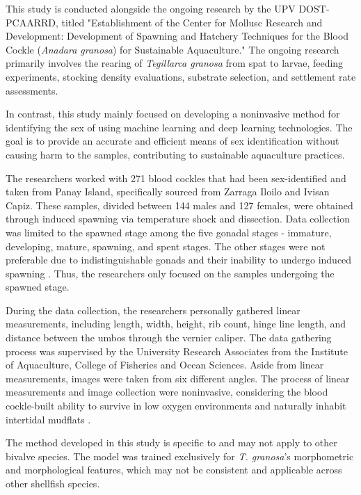 This study is conducted alongside the ongoing research by the UPV DOST-PCAARRD, titled "Establishment of the Center for Mollusc Research and Development: Development of Spawning and Hatchery Techniques for the Blood Cockle (\textit{Anadara granosa}) for Sustainable Aquaculture." The ongoing research primarily involves the rearing of \textit{Tegillarca granosa} from spat to larvae, feeding experiments, stocking density evaluations, substrate selection, and settlement rate assessments.

In contrast, this study mainly focused on developing a noninvasive method for identifying the sex of \Tgranosa using machine learning and deep learning technologies. The goal is to provide an accurate and efficient means of sex identification without causing harm to the samples, contributing to sustainable aquaculture practices.

The researchers worked with 271  blood cockles that had been sex-identified and taken from Panay Island, specifically sourced from Zarraga Iloilo and Ivisan Capiz. These samples, divided between 144 males and 127 females, were obtained through induced spawning via temperature shock and dissection. Data collection was limited to the spawned stage among the five gonadal stages  - immature, developing, mature, spawning, and spent stages. The other stages were not preferable due to indistinguishable gonads and their inability to undergo induced spawning \cite{may2021}.  Thus, the researchers only focused on the samples undergoing the spawned stage. 

During the data collection,  the researchers personally gathered linear measurements, including length, width, height, rib count, hinge line length, and distance between the umbos through the vernier caliper. The data gathering process was supervised by the University Research Associates from the Institute of Aquaculture, College of Fisheries and Ocean Sciences. Aside from linear measurements, images were taken from six different angles. The process of linear measurements and image collection were noninvasive, considering the blood cockle-built ability to survive in low oxygen environments and naturally inhabit intertidal mudflats \cite{zhan2022}.

The method developed in this study is specific to \Tgranosa and may not apply to other bivalve species. The model was trained exclusively for \textit{T. granosa}'s morphometric and morphological features, which may not be consistent and applicable across other shellfish species. 

